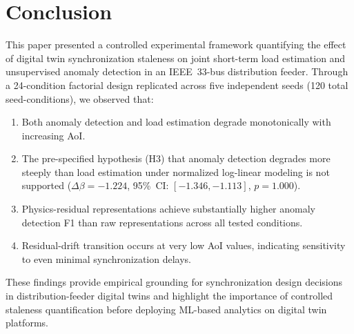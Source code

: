 \documentclass[journal]{IEEEtran}
\newcommand{\dbeta}{\Delta\beta}
\begin{document}
\section{Conclusion}
\label{sec:conclusion}

This paper presented a controlled experimental framework quantifying the
effect of digital twin synchronization staleness on joint short-term load
estimation and unsupervised anomaly detection in an IEEE~33-bus distribution
feeder. Through a 24-condition factorial design replicated across five
independent seeds (120 total seed-conditions), we observed that:

\begin{enumerate}
    \item Both anomaly detection and load estimation degrade monotonically
          with increasing AoI.
    \item The pre-specified hypothesis (H3) that anomaly detection degrades
          more steeply than load estimation under normalized log-linear
          modeling is not supported ($\dbeta = -1.224$, 95\%~CI:
          $[-1.346, -1.113]$, $p = 1.000$).
    \item Physics-residual representations achieve substantially higher
          anomaly detection F1 than raw representations across all
          tested conditions.
    \item Residual-drift transition occurs at very low AoI values,
          indicating sensitivity to even minimal synchronization delays.
\end{enumerate}

These findings provide empirical grounding for synchronization design
decisions in distribution-feeder digital twins and highlight the importance
of controlled staleness quantification before deploying ML-based analytics
on digital twin platforms.





\end{document}
